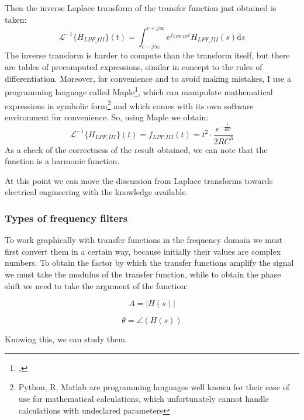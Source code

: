 \documentclass[a4paper, 10pt, final]{article} %
\begin{document}
    \noindent Then the inverse Laplace transform of the transfer function just obtained is taken:
    \begin{equation*}
        \mathcal{L}^{-1}\{H_{LPF\_III}\}(t) = \int_{c-j\infty}^{c+j\infty} e^{f_{LPF\_III}t} H_{LPF\_III}(s) \mathrm{d}s
    \end{equation*}
    \noindent The inverse transform is harder to compute than the transform itself, but there are tables of precomputed expressions, similar in concept to the rules of differentiation.
    Moreover, for convenience and to avoid making mistakes, I use a programming language called Maple\footcite[]{Maplesoft:Software}, which can manipulate mathematical expressions in symbolic form\footnote{Python, R, Matlab are programming languages well known for their ease of use for mathematical calculations, which unfortunately cannot handle calculations with undeclared parameters} and which comes with its own software environment for convenience.
    So, using Maple we obtain:
    \begin{equation*}
        \mathcal{L}^{-1}\{H_{LPF\_III}\}(t) = f_{LPF\_III}(t) = t^2 \cdot \frac{e^{-\frac{t}{RC}}}{2RC^3}
    \end{equation*}
    As a check of the correctness of the result obtained, we can note that the function is a harmonic function.

    At this point we can move the discussion from Laplace transforms towards electrical engineering with the knowledge available.

    \subsubsection{Types of frequency filters}
    To work graphically with transfer functions in the frequency domain we must first convert them in a certain way, because initially their values are complex numbers.
    To obtain the factor by which the transfer functions amplify the signal we must take the modulus of the transfer function, while to obtain the phase shift we need to take the argument of the function:
    \begin{figure}[H]
        \centering
        \begin{minipage}[b]{.31\linewidth}
            \centering
            \begin{equation*}
                A = \left|H(s)\right|
            \end{equation*}
        \end{minipage}
        \hspace{0.04\linewidth}
        \begin{minipage}[b]{.31\linewidth}
            \centering
            \begin{equation*}
                \theta = \angle\left(H(s)\right)
            \end{equation*}
        \end{minipage}
    \end{figure}
    \noindent Knowing this, we can study them.
\end{document}
